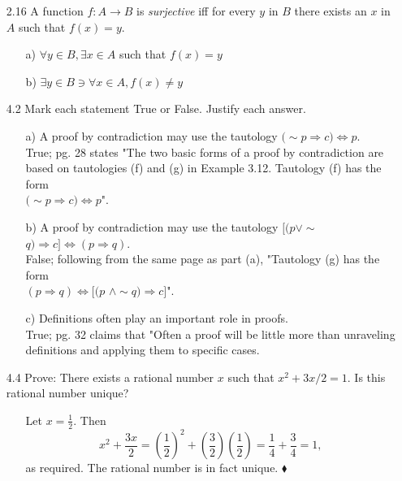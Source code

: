 \documentclass[12pt]{article}
\begin{document}
\begin{enumerate}
\item[2.16] A function $f: A \rightarrow B$ is \emph{surjective} iff for every $y$ in $B$ there exists an $x$ in $A$ such that $f(x) = y$.
\begin{enumerate}
\item[a)] $\forall y \in B, \exists x \in A$ such that $f(x) = y$
\item[b)] $\exists y \in B \ni \forall x \in A, f(x) \neq y$
\end{enumerate}

\item[4.2] Mark each statement True or False. Justify each answer.
\begin{enumerate}
\item[a)] A proof by contradiction may use the tautology $(\sim$$p \Rightarrow c) \Leftrightarrow p$.\\
True; pg. 28 states "The two basic forms of a proof by contradiction are based on tautologies
(f) and (g) in Example 3.12. Tautology (f) has the form \\
$(\sim$$p \Rightarrow c) \Leftrightarrow p$". 
\item[b)] A proof by contradiction may use the tautology $[(p \vee \sim$$q) \Rightarrow c] 
\Leftrightarrow (p \Rightarrow q)$.\\
False; following from the same page as part (a), "Tautology (g) has the form \\
$(p \Rightarrow q) \Leftrightarrow [(p\,\, \wedge \sim$$q) \Rightarrow c]$".
\item[c)] Definitions often play an important role in proofs.\\
True; pg. 32 claims that "Often a proof will be little more than unraveling definitions
and applying them to specific cases.
\end{enumerate}

\item[4.4] Prove: There exists a rational number $x$ such that $x^2 + 3x/2 = 1$. Is this rational number unique?
\begin{enumerate}
\item[]
Let $x = \frac{1}{2}$. Then \[
x^2 + \frac{3x}{2} = \left(\frac{1}{2}\right)^2 + \left(\frac{3}{2}\right)\left(\frac{1}{2}\right) 
= \frac{1}{4} + \frac{3}{4} = 1, \]
as required. The rational number is in fact unique. $\blacklozenge$
\end{enumerate}


\end{enumerate}
\end{document}
